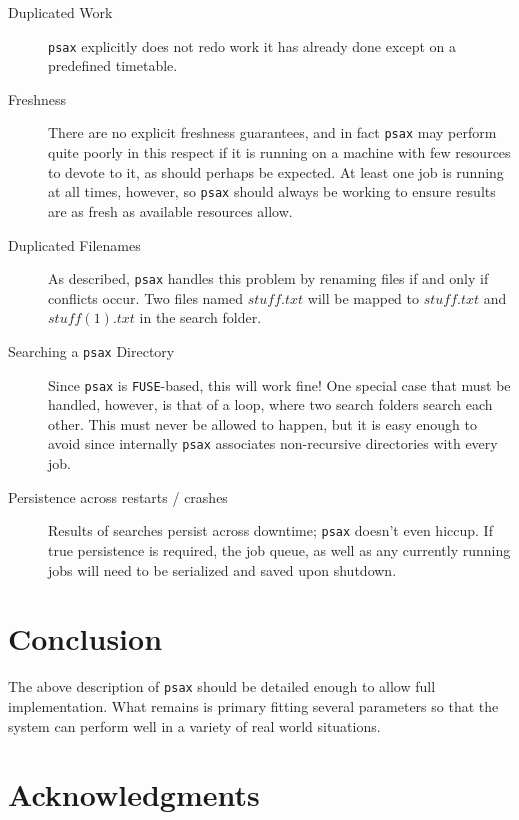 \documentclass[a4paper]{report}
\newcommand{\inlinecode}{\texttt}
\begin{document}
\begin{description}

\item[Duplicated Work] \inlinecode{psax} explicitly does not redo work it has already done except on a predefined timetable.

\item[Freshness] There are no explicit freshness guarantees, and in fact \inlinecode{psax} may perform quite poorly in this respect if it is running on a machine with few resources to devote to it, as should perhaps be expected. At least one job is running at all times, however, so \inlinecode{psax} should always be working to ensure results are as fresh as available resources allow.

\item[Duplicated Filenames] As described, \inlinecode{psax} handles this problem by renaming files if and only if conflicts occur. Two files named $stuff.txt$ will be mapped to $stuff.txt$ and $stuff(1).txt$ in the search folder.

\item[Searching a \inlinecode{psax} Directory] Since \inlinecode{psax} is \inlinecode{FUSE}-based, this will work fine! One special case that must be handled, however, is that of a loop, where two search folders search each other. This must never be allowed to happen, but it is easy enough to avoid since internally \inlinecode{psax} associates non-recursive directories with every job.

\item[Persistence across restarts / crashes] Results of searches persist across downtime; \inlinecode{psax} doesn't even hiccup. If true persistence is required, the job queue, as well as any currently running jobs will need to be serialized and saved upon shutdown.

\end{description}

\section{Conclusion}

The above description of \inlinecode{psax} should be detailed enough to allow full implementation. What remains is primary fitting several parameters so that the system can perform well in a variety of real world situations.

\section{Acknowledgments}
\end{document}
